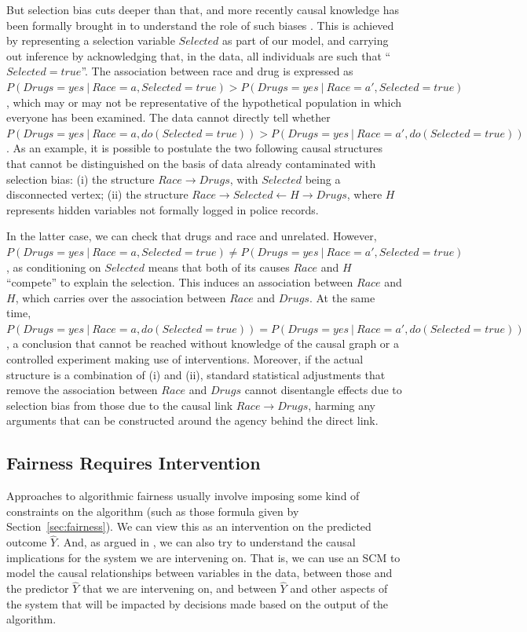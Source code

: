 \documentclass{article}
\begin{document}
But selection bias cuts deeper than that, and more recently causal
knowledge has been formally brought in to understand the role of such biases \cite{spirtes:95b,elias:16}. This is achieved by representing a selection variable $Selected$ as part of our model, 
and carrying out inference by acknowledging that, in the data, all individuals are such that ``$Selected = true$''. The association between race and drug is expressed as
$P(Drugs = yes\ |\ Race = a, Selected = true) > P(Drugs = yes\ |\ Race = a', Selected = true)$,
which may or may not be representative of the hypothetical population in which everyone has been examined. The data cannot directly tell whether
$P(Drugs = yes\ |\ Race = a, do(Selected = true)) > P(Drugs = yes\ |\ Race = a', do(Selected = true))$.
As an example, it is possible to postulate the two following causal structures that cannot be distinguished
on the basis of data already contaminated with selection bias: (i) the structure $Race \rightarrow Drugs$,
with $Selected$ being a disconnected vertex; (ii) the structure $Race \rightarrow Selected \leftarrow H
\rightarrow Drugs$, where $H$ represents hidden variables not formally logged in police records.

In the latter case, we can check that drugs and race and unrelated. However,
$P(Drugs = yes\ |\ Race = a, Selected = true) \neq P(Drugs = yes\ |\ Race = a',
Selected = true)$, as conditioning on $Selected$ means that both of its causes
$Race$ and $H$ ``compete'' to explain the selection. This induces an association
between $Race$ and $H$, which carries over the association between $Race$ and
$Drugs$. At the same time, $P(Drugs = yes\ |\ Race = a, do(Selected = true)) =
P(Drugs = yes\ |\ Race = a', do(Selected = true))$, a conclusion that cannot be
reached without knowledge of the causal graph or a controlled experiment making
use of interventions. Moreover, if the actual structure is a combination of (i)
and (ii), standard statistical adjustments that remove the association between
$Race$ and $Drugs$ cannot disentangle effects due to selection bias from those
due to the causal link $Race \rightarrow Drugs$, harming any arguments that can
be constructed around the agency behind the direct link.

\subsection{Fairness Requires Intervention}

Approaches to algorithmic fairness usually involve imposing some kind of
constraints on the algorithm (such as those formula given by
Section~\ref{sec:fairness}). We can view this as an intervention on the
predicted outcome $\hat Y$. And, as argued in \cite{pmlr-v81-barabas18a}, we can
also try to understand the causal implications for the system we are intervening
on. That is, we can use an SCM to model the causal relationships between
variables in the data, between those and the predictor $\hat Y$ that we are
intervening on, and between $\hat Y$ and other aspects of the system that will
be impacted by decisions made based on the output of the algorithm.
\end{document}
